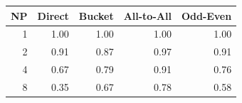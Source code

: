 \begin{tabular}{rrrrr}
  \toprule
  NP & Direct & Bucket & All-to-All & Odd-Even \\
  \midrule
  1 & 1.00 & 1.00 & 1.00 & 1.00 \\
  2 & 0.91 & 0.87 & 0.97 & 0.91 \\
  4 & 0.67 & 0.79 & 0.91 & 0.76 \\
  8 & 0.35 & 0.67 & 0.78 & 0.58 \\
  \bottomrule
\end{tabular}
